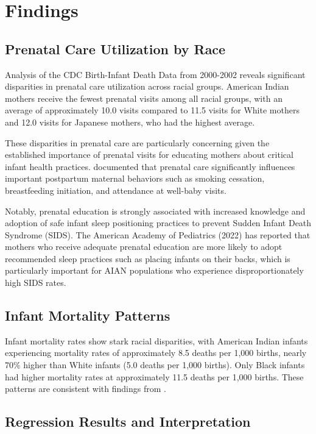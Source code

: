 \documentclass[12pt]{article}
\begin{document}
\section{Findings}

\subsection{Prenatal Care Utilization by Race}

Analysis of the CDC Birth-Infant Death Data from 2000-2002 reveals significant disparities in prenatal care utilization across racial groups. American Indian mothers receive the fewest prenatal visits among all racial groups, with an average of approximately 10.0 visits compared to 11.5 visits for White mothers and 12.0 visits for Japanese mothers, who had the highest average.

These disparities in prenatal care are particularly concerning given the established importance of prenatal visits for educating mothers about critical infant health practices. \citet{reichman2010} documented that prenatal care significantly influences important postpartum maternal behaviors such as smoking cessation, breastfeeding initiation, and attendance at well-baby visits.

Notably, prenatal education is strongly associated with increased knowledge and adoption of safe infant sleep positioning practices to prevent Sudden Infant Death Syndrome (SIDS). The American Academy of Pediatrics (2022) has reported that mothers who receive adequate prenatal education are more likely to adopt recommended sleep practices such as placing infants on their backs, which is particularly important for AIAN populations who experience disproportionately high SIDS rates.

\subsection{Infant Mortality Patterns}

Infant mortality rates show stark racial disparities, with American Indian infants experiencing mortality rates of approximately 8.5 deaths per 1,000 births, nearly 70\% higher than White infants (5.0 deaths per 1,000 births). Only Black infants had higher mortality rates at approximately 11.5 deaths per 1,000 births. These patterns are consistent with findings from \citet{wong2014}.


\subsection{Regression Results and Interpretation}
\end{document}
